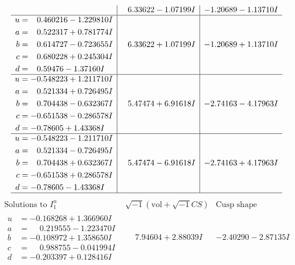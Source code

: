 \documentclass[1p]{elsarticle_modified}
\theoremstyle{definition}
\newcommand{\I}{\sqrt{-1}}
\begin{document}
$$\begin{array}{c|c|c}
 & \phantom{-}6.33622 - 1.07199 I & -1.20689 - 1.13710 I \\ \hline\begin{aligned}
u &= \phantom{-}0.460216 - 1.229810 I \\
a &= \phantom{-}0.522317 + 0.781774 I \\
b &= \phantom{-}0.614727 - 0.723655 I \\
c &= \phantom{-}0.680228 + 0.245304 I \\
d &= \phantom{-}0.59476 - 1.37160 I\end{aligned}
 & \phantom{-}6.33622 + 1.07199 I & -1.20689 + 1.13710 I \\ \hline\begin{aligned}
u &= -0.548223 + 1.211710 I \\
a &= \phantom{-}0.521334 + 0.726495 I \\
b &= \phantom{-}0.704438 - 0.632367 I \\
c &= -0.651538 - 0.286578 I \\
d &= -0.78605 + 1.43368 I\end{aligned}
 & \phantom{-}5.47474 + 6.91618 I & -2.74163 - 4.17963 I \\ \hline\begin{aligned}
u &= -0.548223 - 1.211710 I \\
a &= \phantom{-}0.521334 - 0.726495 I \\
b &= \phantom{-}0.704438 + 0.632367 I \\
c &= -0.651538 + 0.286578 I \\
d &= -0.78605 - 1.43368 I\end{aligned}
 & \phantom{-}5.47474 - 6.91618 I & -2.74163 + 4.17963 I\\
 \hline 
 \end{array}$$\newpage$$\begin{array}{c|c|c}  
\text{Solutions to }I^u_{1}& \I (\text{vol} + \sqrt{-1}CS) & \text{Cusp shape}\\
 \hline 
\begin{aligned}
u &= -0.168268 + 1.366960 I \\
a &= \phantom{-}0.219555 - 1.223470 I \\
b &= -0.108972 + 1.358650 I \\
c &= \phantom{-}0.988755 - 0.041994 I \\
d &= -0.203397 + 0.128416 I\end{aligned}
 & \phantom{-}7.94604 + 2.88039 I & -2.40290 - 2.87135 I \\ \hline\begin{aligned}

\end{aligned}
\end{array}$$
\end{document}
